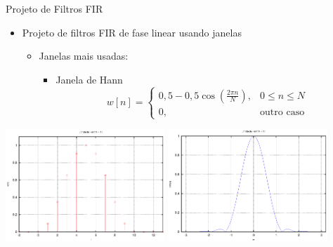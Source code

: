 \begin{slide}{Projeto de Filtros FIR}
\begin{itemize}
   \item  Projeto de filtros FIR de fase linear usando janelas 
   \begin{itemize}
      \item Janelas mais usadas:
      \begin{itemize}
         \item Janela de Hann
         \begin{equation*}
            w[n] = \begin{cases}0,5-0,5\cos\left ( \frac{2\pi n}{N}\right ),&0\leq n\leq N\\ 0,& \text{outro caso}\end{cases}
         \end{equation*}
       \end{itemize}
   \end{itemize}
\end{itemize}
\includegraphics[width=0.45\textwidth]{figs/wn_han_10.eps}
\includegraphics[width=0.45\textwidth]{figs/w_han_10.eps}
\end{slide}

